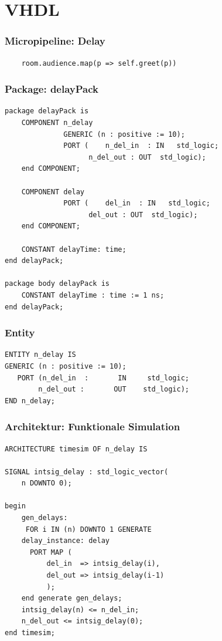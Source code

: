 \documentclass{beamer}
\begin{document}
    \section{VHDL}

    \begin{frame}[fragile]
    \frametitle{Micropipeline: Delay}
    \begin{lstlisting}
    room.audience.map(p => self.greet(p))
    \end{lstlisting}
    \end{frame}


    \begin{frame}[fragile]
        \frametitle{Package: delayPack}
        \begin{lstlisting}[style=vhdl,basicstyle=\ttfamily\small]
package delayPack is 
    COMPONENT n_delay 
              GENERIC (n : positive := 10);
              PORT (    n_del_in  : IN   std_logic;
                    n_del_out : OUT  std_logic);
    end COMPONENT;

    COMPONENT delay
              PORT (    del_in  : IN   std_logic;
                    del_out : OUT  std_logic); 
    end COMPONENT;
    
    CONSTANT delayTime: time;
end delayPack;

package body delayPack is
    CONSTANT delayTime : time := 1 ns;
end delayPack;

        \end{lstlisting}
    \end{frame}

    \begin{frame}[fragile]
        \frametitle{Entity}
        \begin{lstlisting}[style=vhdl]
ENTITY n_delay IS
GENERIC (n : positive := 10);
   PORT (n_del_in  :       IN     std_logic;
        n_del_out :       OUT    std_logic);
END n_delay;
        \end{lstlisting}
    \end{frame}

\begin{frame}[fragile]
        \frametitle{Architektur: Funktionale Simulation}
        \begin{lstlisting}[style=vhdl]
ARCHITECTURE timesim OF n_delay IS

SIGNAL intsig_delay : std_logic_vector(
    n DOWNTO 0);

begin
    gen_delays:
     FOR i IN (n) DOWNTO 1 GENERATE
    delay_instance: delay 
      PORT MAP (
          del_in  => intsig_delay(i),
          del_out => intsig_delay(i-1) 
          );
    end generate gen_delays;
    intsig_delay(n) <= n_del_in;
    n_del_out <= intsig_delay(0);
end timesim;
    \end{lstlisting}
\end{frame}
\end{document}
